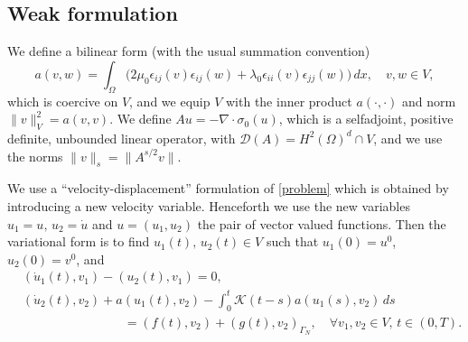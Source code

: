 \documentclass{amsart}
\numberwithin{equation}{section}
\theoremstyle{definition}
\begin{document}
\subsection{Weak formulation}
We define a bilinear form (with the usual summation convention)
\begin{equation}\label{bilinear}
 a(v,w)=\int_{\Omega}\!\big(2\mu_0\epsilon_{ij}(v)\epsilon_{ij}(w) +
\lambda_0\epsilon_{ii}(v)\epsilon_{jj}(w)\big)\,dx,\quad v,w\in V,
\end{equation}
which is coercive on $V$, 
and we equip $V$ with the inner product
$a(\cdot,\cdot)$ and norm
$\|v\|_V^2=a(v,v)$. 
We define $Au=-\nabla\cdot\sigma_0(u)$, which is a selfadjoint, positive
definite, unbounded linear operator, with
${\mathcal D}(A)=H^2(\Omega)^d\cap V$, and we use the norms 
$\|v\|_s=\|A^{s/2}v\|$.

We use a ``velocity-displacement'' formulation of \eqref{problem}
which is obtained by introducing a new velocity variable.
Henceforth we use the new variables $u_1=u,\,u_2=\dot u$ and $u=(u_1,u_2)$
the pair of vector valued functions. 
Then the variational form is to find 
$u_1(t),\,u_2(t)\in V$ such that
$u_1(0)=u^0$, $u_2(0)=v^0$, and
\begin{equation} \label{weakform}
  \begin{split}
    &(\dot u_1(t),v_1)-(u_2(t),v_1)=0,\\
    &(\dot u_2(t),v_2) + a(u_1(t),v_2)
    - \int_0^t {\mathcal K}(t-s) a(u_1(s), v_2) \, ds \\
    &\qquad\qquad\qquad\quad\quad
           = (f(t),v_2) + (g(t),v_2)_{\Gamma_N},
    \quad \forall v_1,v_2 \in V ,\,t\in (0,T).
  \end{split}
\end{equation}
\end{document}
